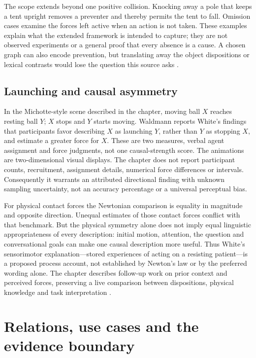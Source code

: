 The scope extends beyond one positive collision. Knocking away a pole
that keeps a tent upright removes a preventer and thereby permits the
tent to fall. Omission cases examine the forces left active when an
action is not taken. These examples explain what the extended framework
is intended to capture; they are not observed experiments or a general
proof that every absence is a cause. A chosen graph can also encode
prevention, but translating away the object dispositions or lexical
contrasts would lose the question this source asks
\cite[pp.~444--445]{Waldmann2021EverydayCausal}.

\subsection{Launching and causal asymmetry}

In the Michotte-style scene described in the chapter, moving ball
\(X\) reaches resting ball \(Y\); \(X\) stops and \(Y\) starts moving.
Waldmann reports White's findings that participants favor describing
\(X\) as launching \(Y\), rather than \(Y\) as stopping \(X\), and
estimate a greater force for \(X\). These are two measures, verbal
agent assignment and force judgments, not one causal-strength score.
The animations are two-dimensional visual displays. The chapter does
not report participant counts, recruitment, assignment details,
numerical force differences or intervals. Consequently it warrants
an attributed directional finding with unknown sampling uncertainty,
not an accuracy percentage or a universal perceptual bias.

For physical contact forces the Newtonian comparison is equality in
magnitude and opposite direction. Unequal estimates of those contact
forces conflict with that benchmark. But the physical symmetry alone
does not imply equal linguistic appropriateness of every description:
initial motion, attention, the question and conversational goals can
make one causal description more useful. Thus White's sensorimotor
explanation---stored experiences of acting on a resisting patient---is
a proposed process account, not established by Newton's law or by
the preferred wording alone. The chapter describes follow-up work
on prior context and perceived forces, preserving a live comparison
between dispositions, physical knowledge and task interpretation
\cite[p.~445]{Waldmann2021EverydayCausal}.

\section{Relations, use cases and the evidence boundary}
\label{sec:p19-rat72-use-and-boundary}

